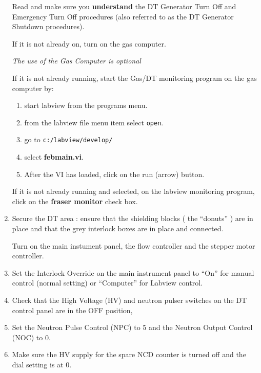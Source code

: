 \begin{enumerate}

\checkitem Read and  make sure you { \bf understand } the DT Generator
Turn Off and Emergency Turn Off procedures (also referred to as the DT Generator Shutdown
procedures).


\checkitem If it is not already on, turn on the gas computer.

{\em The use of the Gas Computer is optional }

\checkitem If it is not already running, start the Gas/DT monitoring
  program on the gas computer by:
  \begin{enumerate}
  \item start labview from the programs menu.
  \item from the labview file menu item select {\tt open}.
  \item go to {\tt c:/labview/develop/}
  \item select {\bf febmain.vi}.
  \item After the VI has loaded, click on the run (arrow) button.
  \end{enumerate}
\checkitem If it is not already running and selected, on the labview
  monitoring program, click on the {\bf fraser monitor} check box.

\item\checkbox
 Secure the DT area : ensure that the shielding blocks ( the ``donuts'' )
 are in place and that the grey interlock boxes are in place and connected.

\checkitem
  Turn on the main instument panel, the flow controller and the stepper
motor controller.

\item\checkbox
 Set the Interlock Override on the main instrument panel
 to ``On'' for manual control (normal setting) or ``Computer'' for
 Labview control.


\item\checkbox
 Check that the High Voltage (HV) and neutron pulser
 switches on the DT control panel are in the OFF position,

\item\checkbox
   Set the Neutron Pulse Control (NPC) to 5 and the Neutron
   Output Control (NOC) to 0. 



\item\checkbox Make sure the HV supply for the spare NCD counter is turned
off and the dial setting is at 0.


\end{enumerate}
